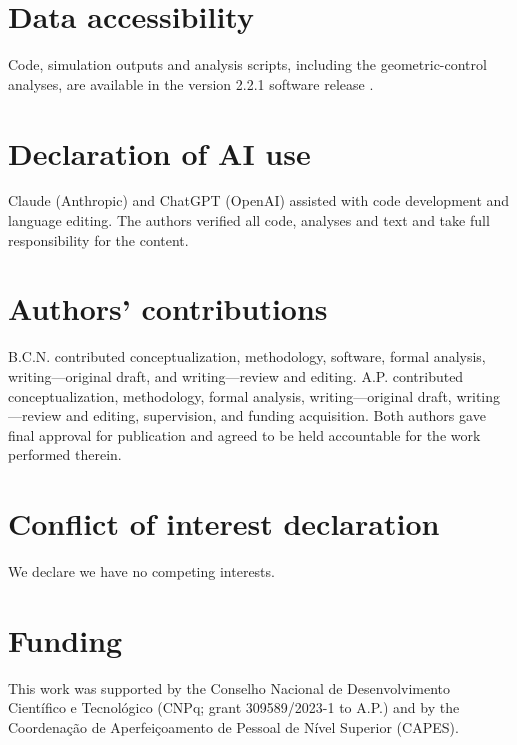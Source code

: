 \documentclass[11pt]{article}
\begin{document}
\section*{Data accessibility}
Code, simulation outputs and analysis scripts, including the geometric-control analyses, are available in the version 2.2.1 software release \cite{SnakeModel2026}.

\section*{Declaration of AI use}
Claude (Anthropic) and ChatGPT (OpenAI) assisted with code development and language editing. The authors verified all code, analyses and text and take full responsibility for the content.

\section*{Authors' contributions}
B.C.N. contributed conceptualization, methodology, software, formal analysis, writing---original draft, and writing---review and editing. A.P. contributed conceptualization, methodology, formal analysis, writing---original draft, writing---review and editing, supervision, and funding acquisition. Both authors gave final approval for publication and agreed to be held accountable for the work performed therein.

\section*{Conflict of interest declaration}
We declare we have no competing interests.

\section*{Funding}
This work was supported by the Conselho Nacional de Desenvolvimento Cient\'ifico e Tecnol\'ogico (CNPq; grant 309589/2023-1 to A.P.) and by the Coordena\c{c}\~ao de Aperfei\c{c}oamento de Pessoal de N\'ivel Superior (CAPES).

\clearpage


\end{document}
